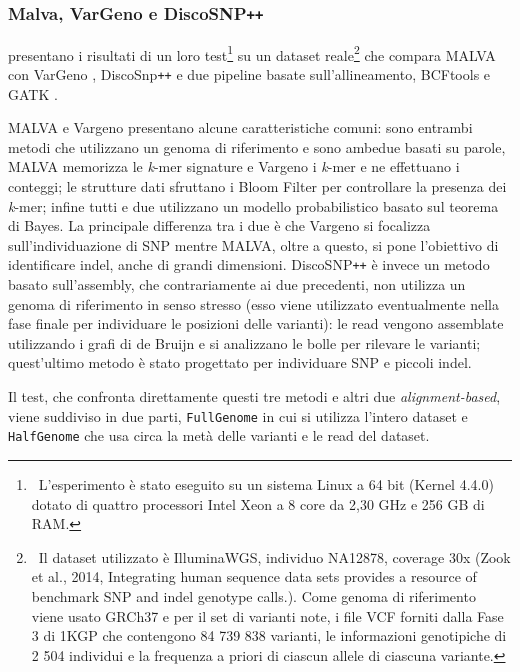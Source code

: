 \documentclass[../main.tex]{subfiles}
\begin{document}
\subsubsection{Malva, VarGeno e DiscoSNP\texttt{++}}

\noindent
\cite{bernardini2019malva} presentano i risultati di un loro test\footnote{\ L'esperimento è stato eseguito su un sistema Linux a 64 bit (Kernel 4.4.0) dotato di quattro processori Intel Xeon a 8 core da 2,30 GHz e 256 GB di RAM.} su un dataset reale\footnote{\ Il dataset utilizzato è IlluminaWGS, individuo NA12878, coverage 30x (Zook et al., 2014, Integrating human sequence data sets provides a resource of benchmark SNP and indel genotype calls.). Come genoma di riferimento viene usato GRCh37 e per il set di varianti note, i file VCF forniti dalla Fase 3 di 1KGP che contengono  84 739 838 varianti, le informazioni genotipiche di 2 504 individui e la frequenza a priori di ciascun allele di ciascuna variante.} che compara MALVA con VarGeno \cite{sun-medvedev2018vargeno}, DiscoSnp\texttt{++} \cite{peterlongo2017discosnp++} e due pipeline basate sull'allineamento, BCFtools e GATK \cite{McKenna2010gatk}. 

MALVA e Vargeno presentano alcune caratteristiche comuni: sono entrambi metodi che utilizzano un genoma di riferimento e sono ambedue basati su parole, MALVA memorizza le \textit{k}-mer signature e Vargeno i \textit{k}-mer e ne effettuano i conteggi; le strutture dati sfruttano i Bloom Filter per controllare la presenza dei \textit{k}-mer; infine tutti e due utilizzano un modello probabilistico basato sul teorema di Bayes. La principale differenza tra i due è che Vargeno si focalizza sull'individuazione di SNP mentre MALVA, oltre a questo, si pone l'obiettivo di identificare indel, anche di grandi dimensioni. DiscoSNP\texttt{++} è invece un metodo basato sull'assembly, che contrariamente ai due precedenti, non utilizza un genoma di riferimento in senso stresso (esso viene utilizzato eventualmente nella fase finale per individuare le posizioni delle varianti): le read vengono assemblate utilizzando i grafi di de Bruijn e si analizzano le bolle per rilevare le varianti; quest'ultimo metodo è stato progettato per individuare SNP e piccoli indel.

Il test, che confronta direttamente questi tre metodi e altri due \textit{alignment-based}, viene suddiviso in due parti, \texttt{FullGenome} in cui si utilizza l'intero dataset e \texttt{HalfGenome} che usa circa la metà delle varianti e le read del dataset.
\end{document}
